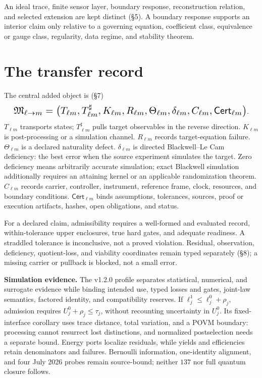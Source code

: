 \documentclass[10pt,a4paper,twocolumn]{extarticle}
\begin{document}
An ideal trace, finite sensor layer, boundary response, reconstruction
relation, and selected extension are kept distinct (\S5).  A
boundary response supports an interior claim only relative to a governing
equation, coefficient class, equivalence or gauge class, regularity, data
regime, and stability theorem.

\section*{The transfer record}

The central added object is (\S7)
\[
\resizebox{0.96\columnwidth}{!}{$\displaystyle
\mathfrak M_{\ell\to m}=
\bigl(T_{\ell m},T_{\ell m}^{\sharp},K_{\ell m},R_{\ell m},
\Theta_{\ell m},\delta_{\ell m},C_{\ell m},\mathsf{Cert}_{\ell m}\bigr)
$}.
\]
\(T_{\ell m}\) transports states; \(T_{\ell m}^{\sharp}\) pulls target
observables in the reverse direction.  \(K_{\ell m}\) is post-processing or a
simulation channel.  \(R_{\ell m}\) records target-equation failure.
\(\Theta_{\ell m}\) is a declared naturality defect.  \(\delta_{\ell m}\) is
directed Blackwell--Le Cam deficiency: the best error when the source
experiment simulates the target.  Zero deficiency means arbitrarily accurate
simulation; exact Blackwell simulation additionally requires an attaining
kernel or an applicable randomization theorem.  \(C_{\ell m}\) records carrier, controller,
instrument, reference frame, clock, resources, and boundary conditions.
\(\mathsf{Cert}_{\ell m}\) binds assumptions, tolerances, sources, proof or
execution artifacts, hashes, open obligations, and status.

For a declared claim, admissibility requires a well-formed and evaluated
record, within-tolerance upper enclosures, true hard gates, and adequate
readiness.  A straddled tolerance is inconclusive, not a proved violation.
Residual, observation, deficiency, quotient-loss, and viability coordinates
remain typed separately (\S8); a missing carrier or pullback is blocked, not
a small error.

\textbf{Simulation evidence.}
The v1.2.0 profile separates statistical, numerical, and surrogate evidence
while binding intended use, typed losses and gates, joint-law semantics,
factored identity, and compatibility reserves.  If
\(\ell^1_j\le\ell^0_j+\rho_j\), admission requires
\(U^0_j+\rho_j\le\tau_j\), without recounting uncertainty in \(U^0_j\).
Its fixed-interface corollary uses trace distance, total variation, and a
POVM boundary: processing cannot resurrect lost distinctions, and normalized
postselection needs a separate bound.  Energy ports localize residuals, while
yields and efficiencies retain denominators and failures.  Bernoulli
information, one-identity alignment, and four July 2026 probes remain
source-bound; neither \(137\) nor full quantum closure follows.
\end{document}
